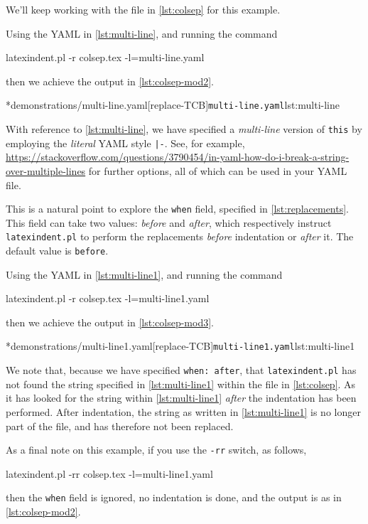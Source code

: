 	\begin{example}
		We'll keep working with the file in \vref{lst:colsep} for this example.

		Using the YAML in \cref{lst:multi-line}, and running the command
		\begin{commandshell}
latexindent.pl -r colsep.tex -l=multi-line.yaml
\end{commandshell}
		then we achieve the output in \cref{lst:colsep-mod2}.
		\begin{cmhtcbraster}[raster column skip=.01\linewidth]
			\cmhlistingsfromfile*[style=yaml-LST]*{demonstrations/multi-line.yaml}[replace-TCB]{\texttt{multi-line.yaml}}{lst:multi-line}
		\end{cmhtcbraster}
		With reference to \cref{lst:multi-line}, we have specified a \emph{multi-line} version of \texttt{this} by employing the \emph{literal}
		YAML style \lstinline!|-!. See, for example, \href{https://stackoverflow.com/questions/3790454/in-yaml-how-do-i-break-a-string-over-multiple-lines}{https://stackoverflow.com/questions/3790454/in-yaml-how-do-i-break-a-string-over-multiple-lines}
		for further options, all of which can be used in your YAML file.

		This is a natural point to explore the \texttt{when} field, specified in \vref{lst:replacements}. This field can take two values: \emph{before}
		and \emph{after}, which respectively instruct \texttt{latexindent.pl} to perform the replacements \emph{before} indentation or \emph{after} it.
		The default value is \texttt{before}.

		Using the YAML in \cref{lst:multi-line1}, and running the command
		\begin{commandshell}
latexindent.pl -r colsep.tex -l=multi-line1.yaml
\end{commandshell}
		then we achieve the output in \cref{lst:colsep-mod3}.
		\begin{cmhtcbraster}[raster column skip=.01\linewidth]
			\cmhlistingsfromfile*[style=yaml-LST]*{demonstrations/multi-line1.yaml}[replace-TCB]{\texttt{multi-line1.yaml}}{lst:multi-line1}
		\end{cmhtcbraster}
		We note that, because we have specified \texttt{when: after}, that \texttt{latexindent.pl} has not found the string specified
		in \cref{lst:multi-line1} within the file in \vref{lst:colsep}. As it has looked for the string within \cref{lst:multi-line1} \emph{after} the indentation has been performed. After
		indentation, the string as written in \cref{lst:multi-line1} is no longer part of the file, and has therefore not been replaced.

		As a final note on this example, if you use the \texttt{-rr} switch, as follows,
		\begin{commandshell}
latexindent.pl -rr colsep.tex -l=multi-line1.yaml
\end{commandshell}
		then the \texttt{when} field is ignored, no indentation is done, and the output is as in \cref{lst:colsep-mod2}.
	\end{example}

